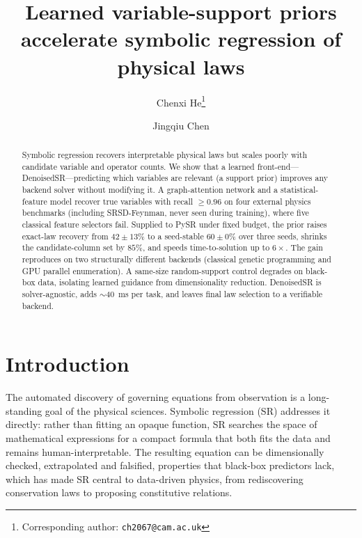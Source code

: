\documentclass[11pt]{article}
\title{\bfseries Learned variable-support priors accelerate symbolic regression of physical laws}
\author[1]{Chenxi He\thanks{Corresponding author: \texttt{ch2067@cam.ac.uk}}}
\author[2]{Jingqiu Chen}
\affil[1]{\small Cavendish Laboratory, University of Cambridge, Cambridge CB3 0HE, United Kingdom}
\affil[2]{\small College of Physics and Optoelectronic Engineering, Shenzhen University, Shenzhen 518060, China}
\date{}
\begin{document}
\maketitle

\begin{abstract}
\noindent
Symbolic regression recovers interpretable physical laws but scales poorly
with candidate variable and operator counts. We show that a learned
front-end---DenoisedSR---predicting which variables are relevant (a support
prior) improves any backend solver without modifying it. A graph-attention
network and a statistical-feature model recover true variables with recall
$\ge 0.96$ on four external physics benchmarks (including SRSD-Feynman, never
seen during training), where five classical feature selectors fail. Supplied
to PySR under fixed budget, the prior raises exact-law recovery from
$42{\pm}13\%$ to a seed-stable $60{\pm}0\%$ over three seeds, shrinks the
candidate-column set by $85\%$, and speeds time-to-solution up to $6\times$.
The gain reproduces on two structurally different backends (classical genetic
programming and GPU parallel enumeration). A same-size random-support control
degrades on black-box data, isolating learned guidance from dimensionality
reduction. DenoisedSR is solver-agnostic, adds $\sim$40~ms per task, and
leaves final law selection to a verifiable backend.
\end{abstract}

\section{Introduction}
The automated discovery of governing equations from observation is a long-standing
goal of the physical sciences\cite{schmidt2009distilling,udrescu2020aifeynman,%
makke2024interpretable}. Symbolic regression (SR) addresses it directly: rather
than fitting an opaque function, SR searches the space of mathematical expressions
for a compact formula that both fits the data and remains
human-interpretable\cite{koza1992genetic,cranmer2023pysr}. The resulting equation
can be dimensionally checked, extrapolated and falsified, properties that black-box
predictors lack, which has made SR central to data-driven physics, from
rediscovering conservation laws to proposing constitutive
relations\cite{brunton2016sindy,udrescu2020aifeynman,tenachi2023physo}.
\end{document}
